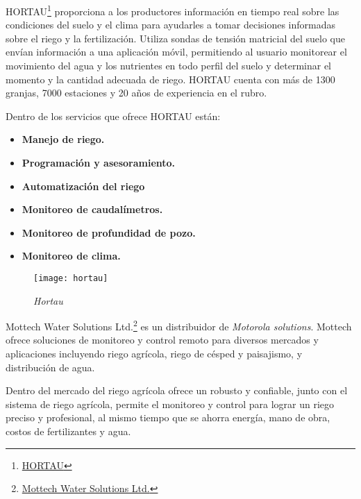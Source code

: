 HORTAU\footnote{\href{https://hortau.com/es/}{HORTAU}} proporciona a los productores información en tiempo real sobre las condiciones del suelo y el clima para ayudarles a tomar decisiones informadas sobre el riego y la fertilización.
Utiliza sondas de tensión matricial del suelo que envían información a una aplicación móvil, permitiendo al usuario monitorear el movimiento del agua y los nutrientes en todo perfil del suelo y determinar el momento y la cantidad adecuada de riego.
HORTAU cuenta con más de 1300 granjas, 7000 estaciones y 20 años de experiencia en el rubro.

Dentro de los servicios que ofrece HORTAU están:
\begin{itemize}
    \item \textbf{Manejo de riego.}
    \item \textbf{Programación y asesoramiento.}
    \item \textbf{Automatización del riego}
    \item \textbf{Monitoreo de caudalímetros.}
    \item \textbf{Monitoreo de profundidad de pozo.}
    \item \textbf{Monitoreo de clima.}
\end{itemize}

\begin{figure}[h]
	\centering
	\texttt{[image: hortau]}
	\caption{\label{fig:netafim} \textit{Hortau}}
\end{figure}

Mottech Water Solutions Ltd.\footnote{\href{https://mottech.com/}{Mottech Water Solutions Ltd.}} es un distribuidor de \textit{Motorola solutions}. Mottech ofrece soluciones de monitoreo y control remoto para diversos mercados y aplicaciones incluyendo riego agrícola, riego de césped y paisajismo, y distribución de agua.

Dentro del mercado del riego agrícola ofrece un  robusto y confiable, junto con el sistema de riego agrícola, permite el monitoreo y control para lograr un riego preciso y profesional, al mismo tiempo que se ahorra energía, mano de obra, costos de fertilizantes y agua.


